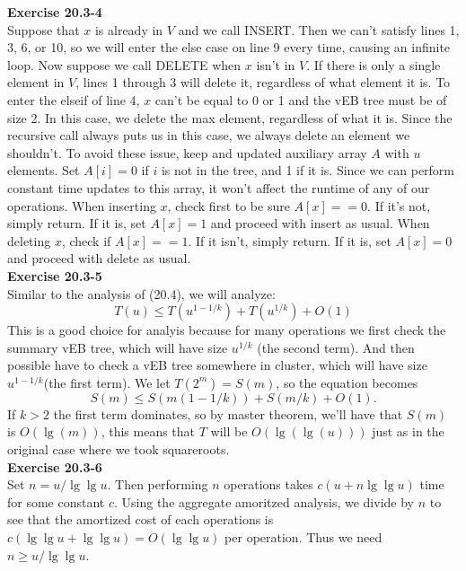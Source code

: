\documentclass{article}
\begin{document}
\noindent\textbf{Exercise 20.3-4}\\

Suppose that $x$ is already in $V$ and we call INSERT.  Then we can't satisfy lines 1, 3, 6, or 10, so we will enter the else case on line 9 every time, causing an infinite loop.  Now suppose we call DELETE when $x$ isn't in $V$. If there is only a single element in $V$, lines 1 through 3 will delete it, regardless of what element it is.  To enter the elseif of line 4, $x$ can't be equal to 0 or 1 and the vEB tree must be of size 2.  In this case, we delete the max element, regardless of what it is.  Since the recursive call always puts us in this case, we always delete an element we shouldn't.  To avoid these issue, keep and updated auxiliary array $A$ with $u$ elements.  Set $A[i] = 0$ if $i$ is not in the tree, and 1 if it is.  Since we can perform constant time updates to this array, it won't affect the runtime of any of our operations.  When inserting $x$, check first to be sure $A[x] == 0$.  If it's not, simply return.  If it is, set $A[x] = 1$ and proceed with insert as usual.  When deleting $x$, check if $A[x] == 1$.  If it isn't, simply return.  If it is, set $A[x] = 0$ and proceed with delete as usual. \\

\noindent\textbf{Exercise 20.3-5}\\

Similar to the analysis of (20.4), we will analyze:
\[
T(u) \le T(u^{1-1/k}) + T(u^{1/k}) + O(1)
\]
This is a good choice for analyis because for many operations we first check the summary vEB tree, which will have size $u^{1/k}$ (the second term). And then possible have to check a vEB tree somewhere in cluster, which will have size $u^{1-1/k}$(the first term). We let $T(2^m) = S(m)$, so the equation becomes
\[
S(m) \le S(m(1-1/k)) + S(m/k) + O(1).
\]
If $k>2$ the first term dominates, so by master theorem, we'll have that $S(m)$ is $O(\lg(m))$, this means that $T$ will be $O(\lg(\lg(u)))$ just as in the original case where we took squareroots.\\

\noindent\textbf{Exercise 20.3-6}\\

Set $n = u/\lg\lg u$.  Then performing $n$ operations takes $c(u + n\lg\lg u)$ time for some constant $c$.  Using the aggregate amoritzed analysis, we divide by $n$ to see that the amortized cost of each operations is $c(\lg \lg u + \lg \lg u) = O(\lg \lg u)$ per operation.  Thus we need $n \geq u/\lg\lg u$.\\
\end{document}
